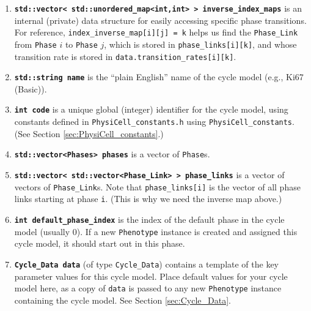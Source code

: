 \documentclass[12pt]{article}
\renewcommand{\v}{\verb}
\newcommand{\smallcode}[1]{\textbf{\texttt{#1}}}
\begin{document}
\begin{enumerate}
\item 
\smallcode{std::vector< std::unordered\_map<int,int> > inverse\_index\_maps} is an internal (private) data structure for easily 
accessing specific phase transitions. For reference, \hfill\break
\v|index_inverse_map[i][j] = k| helps us find the \v|Phase_Link| from 
\v|Phase| $i$ to \v|Phase| $j$, which is stored in \v|phase_links[i][k]|, 
and whose transition rate is stored in \hfill\break \v|data.transition_rates[i][k]|. 

\item 
\smallcode{std::string name} is the ``plain English'' name of the cycle model (e.g., Ki67 (Basic)). 

\item 
\smallcode{int code} is a unique global (integer) identifier for the cycle model, using constants 
defined in \hfill\break
\v|PhysiCell_constants.h| using \v|PhysiCell_constants|. (See Section 
\ref{sec:PhysiCell_constants}.) 

\item 
\smallcode{std::vector<Phases> phases} is a vector of \v|Phase|s. 

\item 
\smallcode{std::vector< std::vector<Phase\_Link> > phase\_links} is a vector of vectors of \v|Phase_Link|s. 
Note that \v|phase_links[i]| is the vector of all phase links starting at phase \v|i|. 
(This is why we need the inverse map above.) 

\item 
\smallcode{int default\_phase\_index} is the index of the default phase in the cycle model (usually 0). 
If a new \v|Phenotype| instance is created and assigned this cycle model, it should start out 
in this phase. 

\item 
\smallcode{Cycle\_Data data} (of type \v|Cycle_Data|) contains a template of the key parameter values for this 
cycle model. Place default values for your cycle model here, as a copy of \v|data| is passed to 
any new \v|Phenotype| instance containing the cycle model. See Section \ref{sec:Cycle_Data}. 
\end{enumerate}
\end{document}
